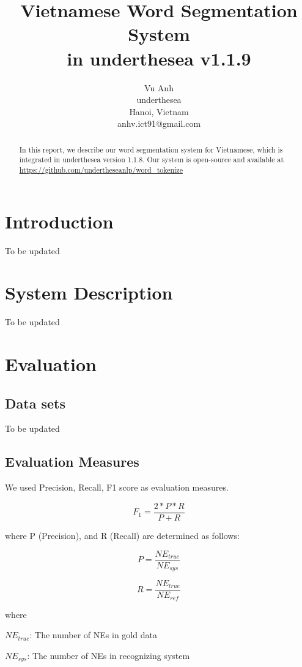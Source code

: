 \documentclass[11pt,a4paper]{article}
\title{Vietnamese Word Segmentation System \\ in underthesea v1.1.9}
\author{
Vu Anh\\
underthesea\\
Hanoi, Vietnam\\
anhv.ict91@gmail.com
}
\date{}
\begin{document}
\maketitle
\begin{abstract}
In this report, we describe our word segmentation system for Vietnamese, which is integrated in underthesea version 1.1.8.
Our system is open-source and available at \url{https://github.com/undertheseanlp/word_tokenize}

\end{abstract}

\section{Introduction}

To be updated

\section{System Description}

To be updated

\section{Evaluation}

\subsection{Data sets}

To be updated


\subsection{Evaluation Measures}

We used Precision, Recall, F1 score as evaluation measures.

$$F_1 = \frac{2*P*R}{P + R}$$

where P (Precision), and R (Recall) are determined as follows:

$$P = \frac{{NE}_{true}}{NE_{sys}}$$

$$R = \frac{{NE}_{true}}{NE_{ref}}$$

where

$NE_{true}$: The number of NEs in gold data

$NE_{sys}$: The number of NEs in recognizing system
\end{document}
